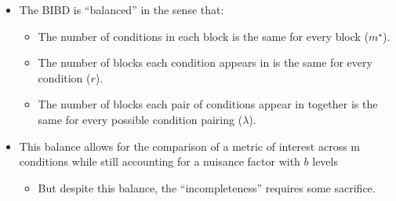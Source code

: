 \begin{itemize}
          \begin{Remark}{Notation}{}
              \begin{itemize}
                  \item $ m $: number of experimental conditions. In our previous example, $ m=3 $.
                  \item $ b $: number of blocks. In our previous example, $ b=6 $.
                  \item $ m^\star $: number of experimental conditions that can be run in each block. Also known as ``block size.'' In our previous example, $ m^\star=2 $.
                        \begin{itemize}
                            \item RCBD\@: $ m^\star=m $.
                            \item BIBD\@: $ m^\star<m $.
                        \end{itemize}
                  \item $ r $: number of blocks in which each condition appears. In our previous example, $ r=4 $.
                  \item $ \lambda $: number of blocks that \emph{any} pair of conditions appear in together. In our previous example, $ \lambda=2 $.
              \end{itemize}
          \end{Remark}
    \item The BIBD is ``balanced'' in the sense that:
          \begin{itemize}
              \item The number of conditions in each block is the same for every block ($ m^\star $).
              \item The number of blocks each condition appears in is the same for every condition ($ r $).
              \item The number of blocks each pair of conditions appear in together is the same for every possible
                    condition pairing ($ \lambda $).
          \end{itemize}
    \item This balance allows for the comparison of a metric of interest across m conditions while still accounting
          for a nuisance factor with $b$ levels
          \begin{itemize}
              \item But despite this balance, the ``incompleteness'' requires some sacrifice.
          \end{itemize}
\end{itemize}
